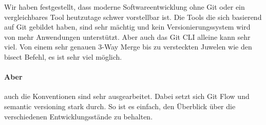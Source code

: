 Wir haben festgestellt, dass moderne Softwareentwicklung ohne Git oder ein vergleichbares Tool heutzutage schwer vorstellbar ist.
Die Tools die sich basierend auf Git gebildet haben, sind sehr mächtig und kein Versionierungssystem wird von mehr Anwendungen unterstützt.
Aber auch das Git CLI alleine kann sehr viel.
Von einem sehr genauen 3-Way Merge bis zu versteckten Juwelen wie den bisect Befehl, es ist sehr viel möglich.

\paragraph{Aber} auch die Konventionen sind sehr ausgearbeitet.
Dabei setzt sich Git Flow und semantic versioning stark durch.
So ist es einfach, den Überblick über die verschiedenen Entwicklungsstände zu behalten.